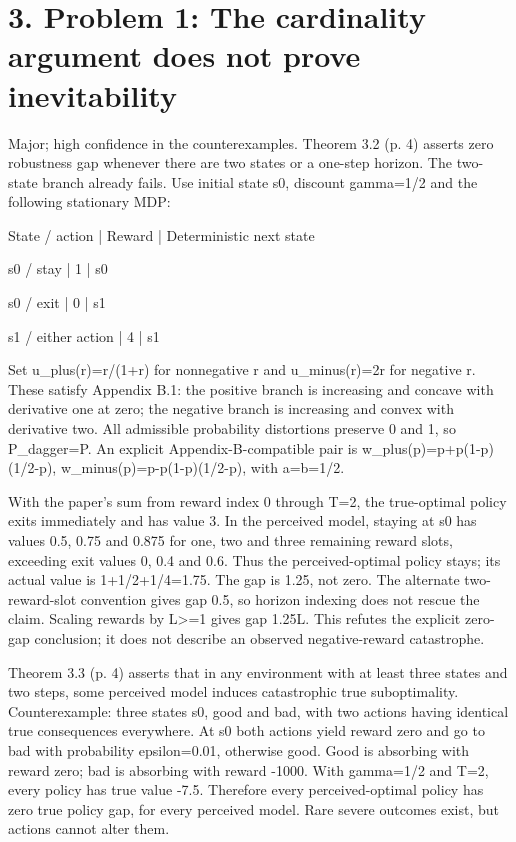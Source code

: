 \documentclass[10pt]{article}
\begin{document}
\section*{3. Problem 1: The cardinality argument does not prove inevitability}
Major; high confidence in the counterexamples. Theorem 3.2 (p. 4) asserts zero robustness gap whenever there are two states or a one-step horizon. The two-state branch already fails. Use initial state s0, discount gamma=1/2 and the following stationary MDP:\par
State / action | Reward | Deterministic next state\par
s0 / stay | 1 | s0\par
s0 / exit | 0 | s1\par
s1 / either action | 4 | s1\par
Set u\_plus(r)=r/(1+r) for nonnegative r and u\_minus(r)=2r for negative r. These satisfy Appendix B.1: the positive branch is increasing and concave with derivative one at zero; the negative branch is increasing and convex with derivative two. All admissible probability distortions preserve 0 and 1, so P\_dagger=P. An explicit Appendix-B-compatible pair is w\_plus(p)=p+p(1-p)(1/2-p), w\_minus(p)=p-p(1-p)(1/2-p), with a=b=1/2.\par
With the paper’s sum from reward index 0 through T=2, the true-optimal policy exits immediately and has value 3. In the perceived model, staying at s0 has values 0.5, 0.75 and 0.875 for one, two and three remaining reward slots, exceeding exit values 0, 0.4 and 0.6. Thus the perceived-optimal policy stays; its actual value is 1+1/2+1/4=1.75. The gap is 1.25, not zero. The alternate two-reward-slot convention gives gap 0.5, so horizon indexing does not rescue the claim. Scaling rewards by L>=1 gives gap 1.25L. This refutes the explicit zero-gap conclusion; it does not describe an observed negative-reward catastrophe.\par
Theorem 3.3 (p. 4) asserts that in any environment with at least three states and two steps, some perceived model induces catastrophic true suboptimality. Counterexample: three states s0, good and bad, with two actions having identical true consequences everywhere. At s0 both actions yield reward zero and go to bad with probability epsilon=0.01, otherwise good. Good is absorbing with reward zero; bad is absorbing with reward -1000. With gamma=1/2 and T=2, every policy has true value -7.5. Therefore every perceived-optimal policy has zero true policy gap, for every perceived model. Rare severe outcomes exist, but actions cannot alter them.\par
\end{document}
